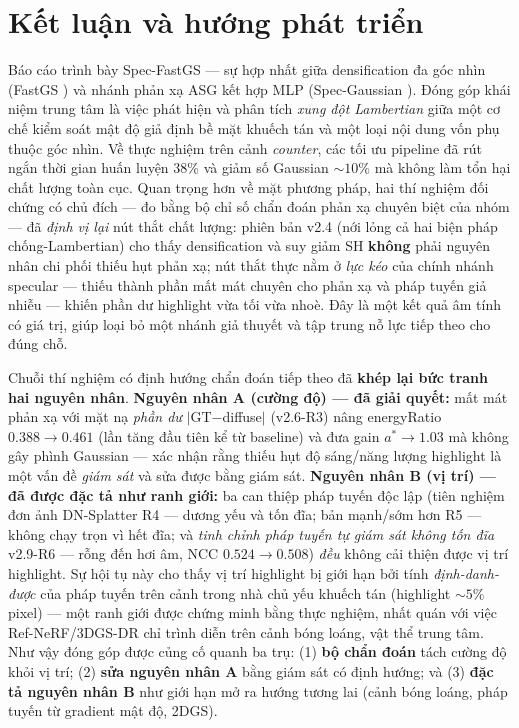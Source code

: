 \section{Kết luận và hướng phát triển}
    Báo cáo trình bày Spec-FastGS — sự hợp nhất giữa densification đa góc nhìn
    (FastGS \cite{fastgs}) và nhánh phản xạ ASG kết hợp MLP (Spec-Gaussian
    \cite{specgaussian}). Đóng góp khái niệm trung tâm là việc phát hiện và phân
    tích \textit{xung đột Lambertian} giữa một cơ chế kiểm soát mật độ giả định bề
    mặt khuếch tán và một loại nội dung vốn phụ thuộc góc nhìn. Về thực nghiệm trên
    cảnh \textit{counter}, các tối ưu pipeline đã rút ngắn thời gian huấn luyện
    $38\%$ và giảm số Gaussian $\sim 10\%$ mà không làm tổn hại chất lượng toàn cục.
    Quan trọng hơn về mặt phương pháp, hai thí nghiệm đối chứng có chủ đích — đo bằng
    bộ chỉ số chẩn đoán phản xạ chuyên biệt của nhóm — đã \textit{định vị lại} nút
    thắt chất lượng: phiên bản v2.4 (nới lỏng cả hai biện pháp chống-Lambertian) cho
    thấy densification và suy giảm SH \textbf{không} phải nguyên nhân chi phối thiếu
    hụt phản xạ; nút thắt thực nằm ở \textit{lực kéo} của chính nhánh specular —
    thiếu thành phần mất mát chuyên cho phản xạ và pháp tuyến giả nhiễu — khiến phần
    dư highlight vừa tối vừa nhoè. Đây là một kết quả âm tính có giá trị, giúp loại
    bỏ một nhánh giả thuyết và tập trung nỗ lực tiếp theo cho đúng chỗ.

    Chuỗi thí nghiệm có định hướng chẩn đoán tiếp theo đã \textbf{khép lại bức tranh hai
    nguyên nhân}. \textbf{Nguyên nhân A (cường độ) --- đã giải quyết:} mất mát phản xạ với
    mặt nạ \textit{phần dư} $|$GT$-$diffuse$|$ (v2.6-R3) nâng energyRatio $0.388\to 0.461$
    (lần tăng đầu tiên kể từ baseline) và đưa gain $a^*\to 1.03$ mà không gây phình
    Gaussian --- xác nhận rằng thiếu hụt độ sáng/năng lượng highlight là một vấn đề
    \textit{giám sát} và sửa được bằng giám sát. \textbf{Nguyên nhân B (vị trí) --- đã
    được đặc tả như ranh giới:} ba can thiệp pháp tuyến độc lập (tiên nghiệm đơn ảnh
    DN-Splatter R4 --- dương yếu và tốn đĩa; bản mạnh/sớm hơn R5 --- không chạy trọn vì
    hết đĩa; và \textit{tinh chỉnh pháp tuyến tự giám sát không tốn đĩa} v2.9-R6 --- rỗng
    đến hơi âm, NCC $0.524\to 0.508$) \textit{đều} không cải thiện được vị trí highlight.
    Sự hội tụ này cho thấy vị trí highlight bị giới hạn bởi tính \textit{định-danh-được}
    của pháp tuyến trên cảnh trong nhà chủ yếu khuếch tán (highlight $\sim 5\%$ pixel) ---
    một ranh giới được chứng minh bằng thực nghiệm, nhất quán với việc Ref-NeRF/3DGS-DR
    chỉ trình diễn trên cảnh bóng loáng, vật thể trung tâm. Như vậy đóng góp được củng cố
    quanh ba trụ: (1) \textbf{bộ chẩn đoán} tách cường độ khỏi vị trí; (2) \textbf{sửa
    nguyên nhân A} bằng giám sát có định hướng; và (3) \textbf{đặc tả nguyên nhân B} như
    giới hạn mở ra hướng tương lai (cảnh bóng loáng, pháp tuyến từ gradient mật độ, 2DGS).

